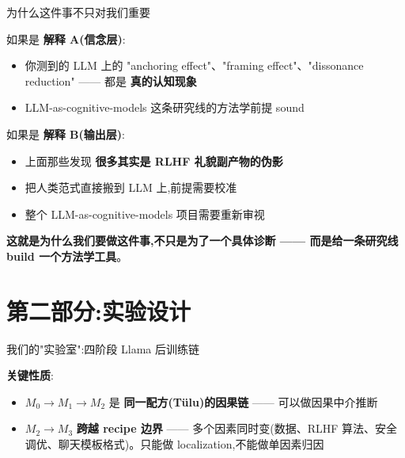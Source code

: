 \documentclass[aspectratio=169,11pt]{ctexbeamer}
\newcommand{\hi}[1]{\textcolor{ow-red}{\textbf{#1}}}
\newcommand{\hib}[1]{\textcolor{ow-blue}{\textbf{#1}}}
\begin{document}
\begin{frame}{为什么这件事不只对我们重要}

如果是 \hi{解释 A(信念层)}:
\begin{itemize}\setlength{\itemsep}{0pt}
\item 你测到的 LLM 上的 "anchoring effect"、"framing effect"、"dissonance reduction" —— 都是 \hib{真的认知现象}
\item LLM-as-cognitive-models 这条研究线的方法学前提 sound
\end{itemize}

\bigskip
如果是 \hi{解释 B(输出层)}:
\begin{itemize}\setlength{\itemsep}{0pt}
\item 上面那些发现 \hib{很多其实是 RLHF 礼貌副产物的伪影}
\item 把人类范式直接搬到 LLM 上,前提需要校准
\item 整个 LLM-as-cognitive-models 项目需要重新审视
\end{itemize}

\bigskip
\hib{这就是为什么我们要做这件事,不只是为了一个具体诊断 —— 而是给一条研究线 build 一个方法学工具}。
\end{frame}

\section{第二部分:实验设计}

\begin{frame}{我们的"实验室":四阶段 Llama 后训练链}

\begin{center}
\end{center}

\bigskip
\textbf{关键性质}:
\begin{itemize}
\item $M_0 \to M_1 \to M_2$ 是 \hib{同一配方(Tülu)的因果链} —— 可以做因果中介推断
\item $M_2 \to M_3$ \hi{跨越 recipe 边界} —— 多个因素同时变(数据、RLHF 算法、安全调优、聊天模板格式)。只能做 localization,不能做单因素归因
\end{itemize}
\end{frame}
\end{document}
